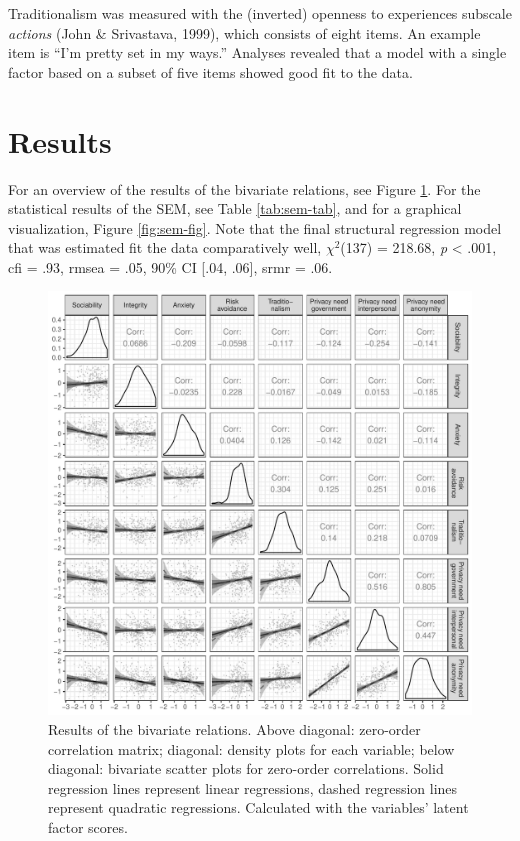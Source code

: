 \documentclass[man,floatsintext]{apa6}
\begin{document}
Traditionalism was measured with the (inverted) openness to experiences subscale \emph{actions} (John \& Srivastava, 1999), which consists of eight items. An example item is \enquote{I'm pretty set in my ways.} Analyses revealed that a model with a single factor based on a subset of five items showed good fit to the data.

\hypertarget{results}{%
\section{Results}\label{results}}

For an overview of the results of the bivariate relations, see Figure \ref{fig:bivar-fig}. For the statistical results of the SEM, see Table \ref{tab:sem-tab}, and for a graphical visualization, Figure \ref{fig:sem-fig}. Note that the final structural regression model that was estimated fit the data comparatively well, \(\chi^2\)(137) = 218.68, \textit{p} \textless{} .001, cfi = .93, rmsea = .05, 90\% CI {[}.04, .06{]}, srmr = .06.

\begin{figure}[!h]

{\centering \includegraphics[width=.9\textwidth]{manuscript_files/figure-latex/bivar-fig-1} 

}

\caption{Results of the bivariate relations. Above diagonal: zero-order correlation matrix; diagonal: density plots for each variable; below diagonal: bivariate scatter plots for zero-order correlations. Solid regression lines represent linear regressions, dashed regression lines represent quadratic regressions. Calculated with the variables’ latent factor scores.}\label{fig:bivar-fig}
\end{figure}
\end{document}

